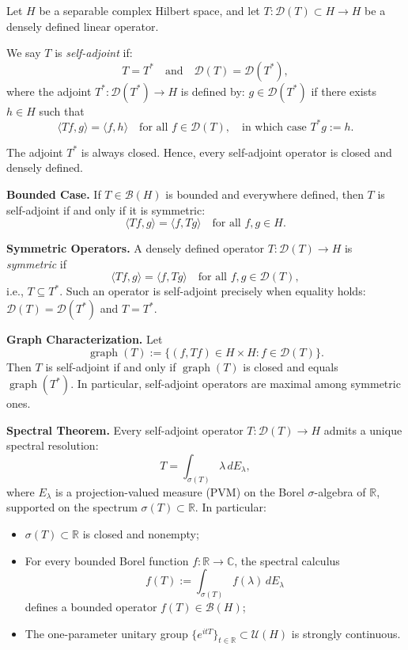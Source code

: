 \begin{definition}\label{def:selfadjoint_operator}
Let \( H \) be a separable complex Hilbert space, and let \( T \colon \mathcal{D}(T) \subset H \to H \) be a densely defined linear operator.

We say \( T \) is \emph{self-adjoint} if:
\[
T = T^* \quad \text{and} \quad \mathcal{D}(T) = \mathcal{D}(T^*),
\]
where the adjoint \( T^* \colon \mathcal{D}(T^*) \to H \) is defined by: \( g \in \mathcal{D}(T^*) \) if there exists \( h \in H \) such that
\[
\langle T f, g \rangle = \langle f, h \rangle \quad \text{for all } f \in \mathcal{D}(T), \quad \text{in which case } T^* g := h.
\]

The adjoint \( T^* \) is always closed. Hence, every self-adjoint operator is closed and densely defined.

\medskip
\noindent\textbf{Bounded Case.}
If \( T \in \mathcal{B}(H) \) is bounded and everywhere defined, then \( T \) is self-adjoint if and only if it is symmetric:
\[
\langle T f, g \rangle = \langle f, T g \rangle \quad \text{for all } f, g \in H.
\]

\medskip
\noindent\textbf{Symmetric Operators.}
A densely defined operator \( T \colon \mathcal{D}(T) \to H \) is \emph{symmetric} if
\[
\langle T f, g \rangle = \langle f, T g \rangle \quad \text{for all } f, g \in \mathcal{D}(T),
\]
i.e., \( T \subseteq T^* \). Such an operator is self-adjoint precisely when equality holds: \( \mathcal{D}(T) = \mathcal{D}(T^*) \) and \( T = T^* \).

\medskip
\noindent\textbf{Graph Characterization.}
Let
\[
\operatorname{graph}(T) := \{ (f, Tf) \in H \times H : f \in \mathcal{D}(T) \}.
\]
Then \( T \) is self-adjoint if and only if \( \operatorname{graph}(T) \) is closed and equals \( \operatorname{graph}(T^*) \). In particular, self-adjoint operators are maximal among symmetric ones.

\medskip
\noindent\textbf{Spectral Theorem.}
Every self-adjoint operator \( T \colon \mathcal{D}(T) \to H \) admits a unique spectral resolution:
\[
T = \int_{\sigma(T)} \lambda \, dE_\lambda,
\]
where \( E_\lambda \) is a projection-valued measure (PVM) on the Borel \( \sigma \)-algebra of \( \mathbb{R} \), supported on the spectrum \( \sigma(T) \subset \mathbb{R} \). In particular:
\begin{itemize}
    \item \( \sigma(T) \subset \mathbb{R} \) is closed and nonempty;
    \item For every bounded Borel function \( f \colon \mathbb{R} \to \mathbb{C} \), the spectral calculus
    \[
    f(T) := \int_{\sigma(T)} f(\lambda)\, dE_\lambda
    \]
    defines a bounded operator \( f(T) \in \mathcal{B}(H) \);
    \item The one-parameter unitary group \( \{ e^{itT} \}_{t \in \mathbb{R}} \subset \mathcal{U}(H) \) is strongly continuous.
\end{itemize}


\end{definition}

